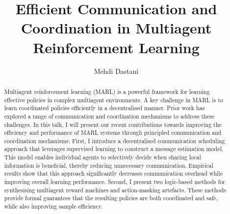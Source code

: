 \author{Mehdi Dastani}
\title{Efficient Communication and Coordination in Multiagent Reinforcement Learning}
\maketitle
\begin{abstract}
	Multiagent reinforcement learning (MARL) is a powerful framework for learning effective policies in complex multiagent environments. A key challenge in MARL is to learn coordinated policies efficiently in a decentralised manner. Prior work has explored a range of communication and coordination mechanisms to address these challenges. In this talk, I will present our recent contributions towards improving the efficiency and performance of MARL systems through principled communication and coordination mechanisms. First, I introduce a decentralised communication scheduling approach that leverages supervised learning to construct a message estimation model. This model enables individual agents to selectively decide when sharing local information is beneficial, thereby reducing unnecessary communication. Empirical results show that this approach significantly decreases communication overhead while improving overall learning performance. Second, I present two logic-based methods for synthesising multiagent reward machines and action-masking artefacts. These methods provide formal guarantees that the resulting policies are both coordinated and safe, while also improving sample efficiency. 
\end{abstract}
\clearpage
